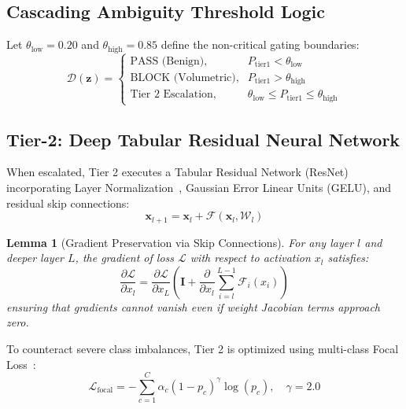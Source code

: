 \documentclass[journal]{IEEEtran}
\newtheorem{lemma}{Lemma}
\begin{document}
\subsection{Cascading Ambiguity Threshold Logic}
Let $\theta_{\text{low}} = 0.20$ and $\theta_{\text{high}} = 0.85$ define the non-critical gating boundaries:
\begin{equation}
\mathcal{D}(\mathbf{z}) = 
\begin{cases}
\text{PASS (Benign)}, & P_{\text{tier1}} < \theta_{\text{low}} \\
\text{BLOCK (Volumetric)}, & P_{\text{tier1}} > \theta_{\text{high}} \\
\text{Tier 2 Escalation}, & \theta_{\text{low}} \le P_{\text{tier1}} \le \theta_{\text{high}}
\end{cases}
\end{equation}

\subsection{Tier-2: Deep Tabular Residual Neural Network}
When escalated, Tier 2 executes a Tabular Residual Network (ResNet) incorporating Layer Normalization~\cite{ba2016layer}, Gaussian Error Linear Units (GELU), and residual skip connections:
\begin{equation}
\mathbf{x}_{l+1} = \mathbf{x}_l + \mathcal{F}(\mathbf{x}_l, \mathcal{W}_l)
\end{equation}
\begin{lemma}[Gradient Preservation via Skip Connections]
For any layer $l$ and deeper layer $L$, the gradient of loss $\mathcal{L}$ with respect to activation $x_l$ satisfies:
\begin{equation}
\frac{\partial \mathcal{L}}{\partial x_l} = \frac{\partial \mathcal{L}}{\partial x_L} \left( \mathbf{I} + \frac{\partial}{\partial x_l} \sum_{i=l}^{L-1} \mathcal{F}_i(x_i) \right)
\end{equation}
ensuring that gradients cannot vanish even if weight Jacobian terms approach zero.
\end{lemma}

To counteract severe class imbalances, Tier 2 is optimized using multi-class Focal Loss~\cite{lin2017focal}:
\begin{equation}
\mathcal{L}_{\text{focal}} = -\sum_{c=1}^C \alpha_c (1 - p_c)^\gamma \log(p_c), \quad \gamma = 2.0
\end{equation}
\end{document}
